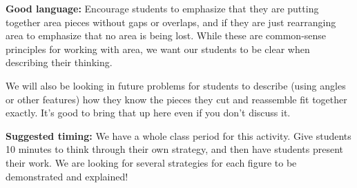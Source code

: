 \documentclass[noauthor,nooutcomes]{ximera}
\begin{document}
\begin{instructorNotes}
{\bf Good language:} Encourage students to emphasize that they are putting together area pieces without gaps or overlaps, and if they are just rearranging area to emphasize that no area is being lost. While these are common-sense principles for working with area, we want our students to be clear when describing their thinking.

We will also be looking in future problems for students to describe (using angles or other features) how they know the pieces they cut and reassemble fit together exactly. It's good to bring that up here even if you don't discuss it.

{\bf Suggested timing:} We have a whole class period for this activity. Give students 10 minutes to think through their own strategy, and then have students present their work. We are looking for several strategies for each figure to be demonstrated and explained!
\end{instructorNotes}
\end{document}
